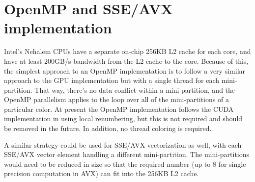\documentclass[12pt]{article}
\begin{document}
%
%
%
%
%



\newpage

\section{OpenMP and SSE/AVX implementation}


Intel's Nehalem CPUs have a separate on-chip 256KB L2 cache for each 
core, and have at least 200GB/s bandwidth from the L2 cache to the core.
Because of this, the simplest approach to an OpenMP implementation is 
to follow a very similar approach to the GPU implementation but with a 
single thread for each mini-partition. That way, there's no data conflict 
within a mini-partition, and the OpenMP parallelism applies to the loop 
over all of the mini-partitions of a particular color. 
At present the OpenMP implementation follows the CUDA implementation in 
using local renumbering, but this is not required and should be removed
in the future.  In addition, no thread coloring is required.

A similar strategy could be used for SSE/AVX vectorization as well, 
with each SSE/AVX vector element handling a different mini-partition. 
The mini-partitions would need to be reduced in size so that the 
required number (up to 8 for single precision computation in AVX) 
can fit into the 256KB L2 cache.
\end{document}
